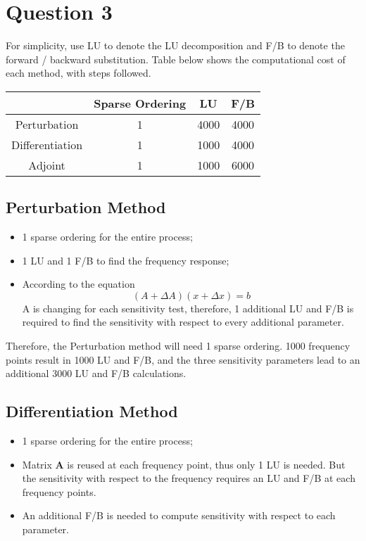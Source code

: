 \documentclass[a4paper,titlepage, 12pt]{article}
\begin{document}
	\section{Question 3}
		For simplicity, use LU to denote the LU decomposition and F/B to denote the forward / backward substitution. Table below shows the computational cost of each method, with steps followed. 
		
		\begin{table}[H]
			\begin{center}
				\begin{tabular}{c|c|c|c}
						& Sparse Ordering & LU & F/B\\\hline
					Perturbation & 1 & 4000 & 4000\\\hline
					Differentiation & 1 & 1000 & 4000\\\hline
					Adjoint & 1 & 1000 & 6000
				\end{tabular}
				\label{Solution}
			\end{center}
		\end{table}
		\subsection{Perturbation Method}
			\begin{itemize}
				\item 1 sparse ordering for the entire process;
				\item 1 LU and 1 F/B to find the frequency response;
				\item According to the equation
				$$
					(A + \Delta A)(x + \Delta x) = b
				$$
				A is changing for each sensitivity test, therefore, 1 additional LU and F/B is required to find the sensitivity with respect to every additional parameter.
			\end{itemize}
			
			Therefore, the Perturbation method will need 1 sparse ordering. 1000 frequency points result in 1000 LU and F/B, and the three sensitivity parameters lead to an additional 3000 LU and F/B calculations. 
		
		\subsection{Differentiation Method}
			\begin{itemize}
				\item 1 sparse ordering for the entire process;
				\item Matrix $\boldsymbol{A}$ is reused at each frequency point, thus only 1 LU is needed. But the sensitivity with respect to the frequency requires an LU and F/B at each frequency points. 
				\item An additional F/B is needed to compute sensitivity with respect to each parameter. 
			\end{itemize}
		
\end{document}
